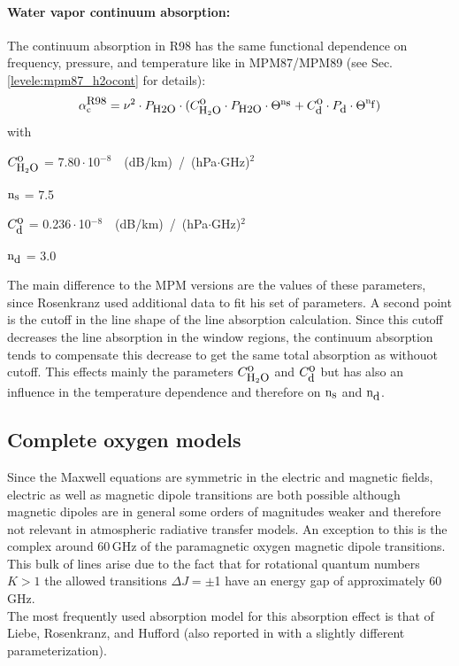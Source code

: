 \paragraph{Water vapor continuum absorption:}
\label{levele:pwr98_h2ocont}
The continuum absorption in R98 has the same functional dependence on frequency,
pressure, and temperature like in MPM87/MPM89 (see Sec. \ref{levele:mpm87_h2ocont}
for details):
\begin{equation} 
  \label{eq:abs_theory:pwr98:abscont}
  \alpha^{\mbox{\rm \small R98}}_{\rm c} = \nu^2 \cdot P_{\mbox{\rm \small H2O}} \cdot 
               (C^{\mbox{\rm o}}_{\mbox{\rm \small H}_{2}\mbox{\rm \small O}} \cdot P_{\mbox{\rm \small H2O}} \cdot \Theta^{{\rm n}_{\mbox{\rm \small s}}} + 
                C^{\mbox{\rm o}}_{\mbox{\rm \small d}} \cdot P_{\mbox{\rm \small d}}  \cdot \Theta^{{\rm n}_{\mbox{\rm \small f}}})
\end{equation}
with
\begin{description}
\item{$C^{\mbox{\rm o}}_{\mbox{\rm \small H}_{2}\mbox{\rm \small O}}$}   = 7.80\,$\cdot$\,10$^{-8}$~~(dB/km)~/~(hPa$\cdot$GHz)$^2$
\item{${\rm n}_{\mbox{\rm \small s}}$}    = 7.5
\item{$C^{\mbox{\rm o}}_{\mbox{\rm \small d}}$}   =  0.236\,$\cdot$\,10$^{-8}$~~(dB/km)~/~(hPa$\cdot$GHz)$^2$
\item{${\rm n}_{\mbox{\rm \small d}}$}    = 3.0
\end{description}
The main difference to the MPM versions are the values of these 
parameters, since Rosenkranz used additional data to fit his set of 
parameters. A second point is the cutoff in the line shape of the line 
absorption calculation. Since this cutoff decreases the line absorption 
in the window regions, the continuum absorption tends to compensate this 
decrease to get the same total absorption as withouot cutoff. This effects 
mainly the parameters $C^{\mbox{\rm o}}_{\mbox{\rm \small H}_{2}\mbox{\rm \small O}}$ and $C^{\mbox{\rm o}}_{\mbox{\rm \small d}}$ but has also an influence in the 
temperature dependence and therefore on ${\rm n}_{\mbox{\rm \small s}}$ and ${\rm n}_{\mbox{\rm \small d}}$.




\subsection{Complete oxygen models}
\label{levelc:02_models}
%
Since the Maxwell equations are symmetric in the electric and
magnetic fields, electric as well as magnetic dipole transitions 
are both possible although magnetic dipoles are in general some
orders of magnitudes weaker and therefore not relevant in
atmospheric radiative transfer models. An exception to this is the complex 
around 60\,GHz of the paramagnetic oxygen magnetic dipole transitions. 
This bulk of lines arise due to the fact that for rotational 
quantum numbers $K>1$ the allowed transitions \mbox{$\Delta J = \pm$1} 
have an energy gap of approximately 60\,GHz.\\
The most frequently used absorption model for this absorption effect is that of
Liebe, Rosenkranz, and Hufford \citep{liebeetal:92} (also reported in 
\citet{pwr:93} with a slightly different parameterization).

